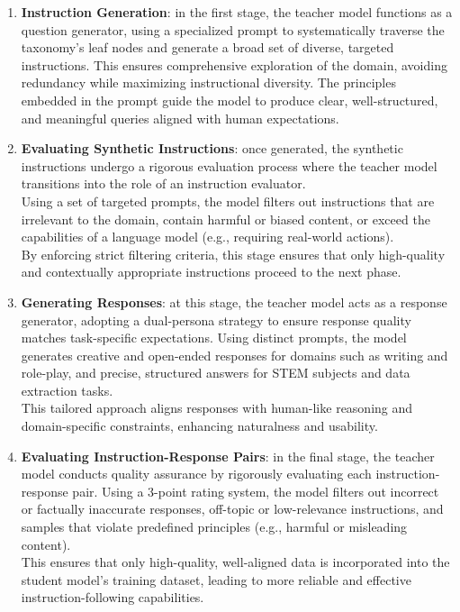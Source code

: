 \documentclass[12pt]{article}
\begin{document}
\begin{enumerate}
    \item \textbf{Instruction Generation}: in the first stage, the teacher model functions as a question generator, using a specialized prompt to systematically traverse the taxonomy’s leaf nodes and generate a broad set of diverse, targeted instructions. This ensures comprehensive exploration of the domain, avoiding redundancy while maximizing instructional diversity. The principles embedded in the prompt guide the model to produce clear, well-structured, and meaningful queries aligned with human expectations.
    \item \textbf{Evaluating Synthetic Instructions}: once generated, the synthetic instructions undergo a rigorous evaluation process where the teacher model transitions into the role of an instruction evaluator.\\
    Using a set of targeted prompts, the model filters out instructions that are irrelevant to the domain, contain harmful or biased content, or exceed the capabilities of a language model (e.g., requiring real-world actions).\\
    By enforcing strict filtering criteria, this stage ensures that only high-quality and contextually appropriate instructions proceed to the next phase.
    \item \textbf{Generating Responses}: at this stage, the teacher model acts as a response generator, adopting a dual-persona strategy to ensure response quality matches task-specific expectations. Using distinct prompts, the model generates creative and open-ended responses for domains such as writing and role-play, and precise, structured answers for STEM subjects and data extraction tasks.\\
    This tailored approach aligns responses with human-like reasoning and domain-specific constraints, enhancing naturalness and usability.
    \item \textbf{Evaluating Instruction-Response Pairs}: in the final stage, the teacher model conducts quality assurance by rigorously evaluating each instruction-response pair. Using a 3-point rating system, the model filters out incorrect or factually inaccurate responses, off-topic or low-relevance instructions, and samples that violate predefined principles (e.g., harmful or misleading content).\\
    This ensures that only high-quality, well-aligned data is incorporated into the student model's training dataset, leading to more reliable and effective instruction-following capabilities.
\end{enumerate}
\end{document}
